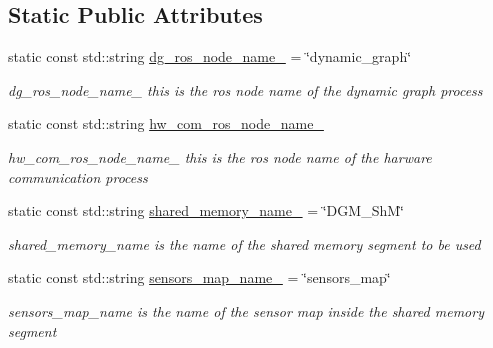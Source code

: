 \subsection*{Static Public Attributes}
\begin{DoxyCompactItemize}
\item 
\mbox{\label{classdynamic__graph_1_1DynamicGraphManager_a391d7a3f7c3df820d31f2c1d0ff7fc51}} 
static const std\+::string \hyperlink{classdynamic__graph_1_1DynamicGraphManager_a391d7a3f7c3df820d31f2c1d0ff7fc51}{dg\+\_\+ros\+\_\+node\+\_\+name\+\_\+} = \char`\"{}dynamic\+\_\+graph\char`\"{}
\begin{DoxyCompactList}\small\item\em dg\+\_\+ros\+\_\+node\+\_\+name\+\_\+ this is the ros node name of the dynamic graph process \end{DoxyCompactList}\item 
static const std\+::string \hyperlink{classdynamic__graph_1_1DynamicGraphManager_a415f24927dbe9dfd0ee4a6462428bd48}{hw\+\_\+com\+\_\+ros\+\_\+node\+\_\+name\+\_\+}
\begin{DoxyCompactList}\small\item\em hw\+\_\+com\+\_\+ros\+\_\+node\+\_\+name\+\_\+ this is the ros node name of the harware communication process \end{DoxyCompactList}\item 
\mbox{\label{classdynamic__graph_1_1DynamicGraphManager_a97fa7b0a31efa6192c3dcc44fbe63886}} 
static const std\+::string \hyperlink{classdynamic__graph_1_1DynamicGraphManager_a97fa7b0a31efa6192c3dcc44fbe63886}{shared\+\_\+memory\+\_\+name\+\_\+} = \char`\"{}D\+G\+M\+\_\+\+ShM\char`\"{}
\begin{DoxyCompactList}\small\item\em shared\+\_\+memory\+\_\+name is the name of the shared memory segment to be used \end{DoxyCompactList}\item 
\mbox{\label{classdynamic__graph_1_1DynamicGraphManager_abd4e4f618fbdacfda8c2cdece08e401b}} 
static const std\+::string \hyperlink{classdynamic__graph_1_1DynamicGraphManager_abd4e4f618fbdacfda8c2cdece08e401b}{sensors\+\_\+map\+\_\+name\+\_\+} = \char`\"{}sensors\+\_\+map\char`\"{}
\begin{DoxyCompactList}\small\item\em sensors\+\_\+map\+\_\+name is the name of the sensor map inside the shared memory segment \end{DoxyCompactList}\item 

\end{DoxyCompactItemize}
